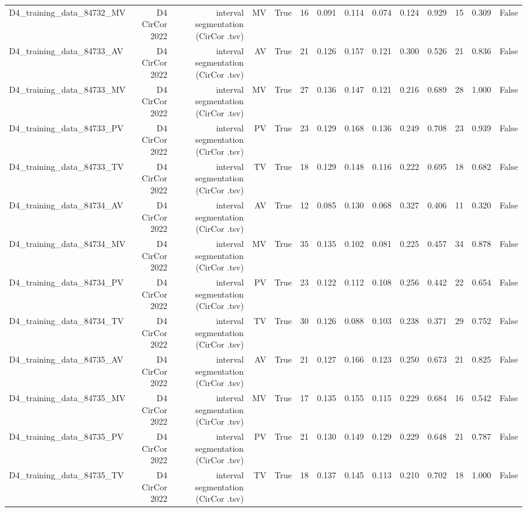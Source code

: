 \begin{table}[htbp]
\begin{tabular}{lrrrrrrrrrrrrr}
    D4\_training\_data\_84732\_MV & D4 CirCor 2022 & interval segmentation (CirCor .tsv) & MV & True & 16 & 0.091 & 0.114 & 0.074 & 0.124 & 0.929 & 15 & 0.309 & False \\
    D4\_training\_data\_84733\_AV & D4 CirCor 2022 & interval segmentation (CirCor .tsv) & AV & True & 21 & 0.126 & 0.157 & 0.121 & 0.300 & 0.526 & 21 & 0.836 & False \\
    D4\_training\_data\_84733\_MV & D4 CirCor 2022 & interval segmentation (CirCor .tsv) & MV & True & 27 & 0.136 & 0.147 & 0.121 & 0.216 & 0.689 & 28 & 1.000 & False \\
    D4\_training\_data\_84733\_PV & D4 CirCor 2022 & interval segmentation (CirCor .tsv) & PV & True & 23 & 0.129 & 0.168 & 0.136 & 0.249 & 0.708 & 23 & 0.939 & False \\
    D4\_training\_data\_84733\_TV & D4 CirCor 2022 & interval segmentation (CirCor .tsv) & TV & True & 18 & 0.129 & 0.148 & 0.116 & 0.222 & 0.695 & 18 & 0.682 & False \\
    D4\_training\_data\_84734\_AV & D4 CirCor 2022 & interval segmentation (CirCor .tsv) & AV & True & 12 & 0.085 & 0.130 & 0.068 & 0.327 & 0.406 & 11 & 0.320 & False \\
    D4\_training\_data\_84734\_MV & D4 CirCor 2022 & interval segmentation (CirCor .tsv) & MV & True & 35 & 0.135 & 0.102 & 0.081 & 0.225 & 0.457 & 34 & 0.878 & False \\
    D4\_training\_data\_84734\_PV & D4 CirCor 2022 & interval segmentation (CirCor .tsv) & PV & True & 23 & 0.122 & 0.112 & 0.108 & 0.256 & 0.442 & 22 & 0.654 & False \\
    D4\_training\_data\_84734\_TV & D4 CirCor 2022 & interval segmentation (CirCor .tsv) & TV & True & 30 & 0.126 & 0.088 & 0.103 & 0.238 & 0.371 & 29 & 0.752 & False \\
    D4\_training\_data\_84735\_AV & D4 CirCor 2022 & interval segmentation (CirCor .tsv) & AV & True & 21 & 0.127 & 0.166 & 0.123 & 0.250 & 0.673 & 21 & 0.825 & False \\
    D4\_training\_data\_84735\_MV & D4 CirCor 2022 & interval segmentation (CirCor .tsv) & MV & True & 17 & 0.135 & 0.155 & 0.115 & 0.229 & 0.684 & 16 & 0.542 & False \\
    D4\_training\_data\_84735\_PV & D4 CirCor 2022 & interval segmentation (CirCor .tsv) & PV & True & 21 & 0.130 & 0.149 & 0.129 & 0.229 & 0.648 & 21 & 0.787 & False \\
    D4\_training\_data\_84735\_TV & D4 CirCor 2022 & interval segmentation (CirCor .tsv) & TV & True & 18 & 0.137 & 0.145 & 0.113 & 0.210 & 0.702 & 18 & 1.000 & False \\

\end{tabular}
\end{table}

